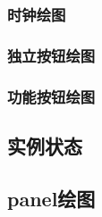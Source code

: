\subsubsection{时钟绘图}
\subsubsection{独立按钮绘图}
\subsubsection{功能按钮绘图}
\subsection{实例状态}
\subsection{panel绘图}
